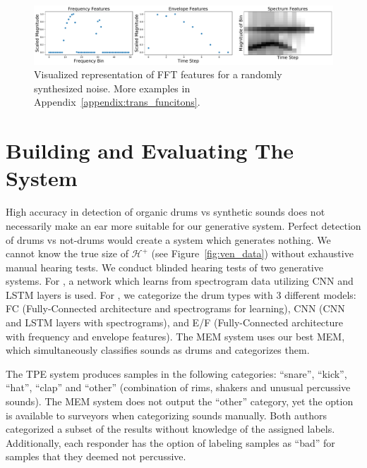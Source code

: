 \documentclass[runningheads,a4paper]{llncs}
\begin{document}
\begin{figure}[tbp]
\begin{center}
    \includegraphics[width=0.99\columnwidth]{templates_aimusic2020/images/ff3.pdf}
\caption{Visualized representation of FFT features for a randomly synthesized noise. More examples in Appendix~\ref{appendix:trans_funcitons}.}
\label{fig:stackspectrums}
    \end{center}
\end{figure}

\section{Building and Evaluating The System}

High accuracy in detection of organic drums vs synthetic sounds does not necessarily make an ear more suitable for our generative system. Perfect detection of drums vs not-drums would create a system which generates nothing.  We cannot know the true size of $\mathcal{H^{+}}$ (see Figure~\ref{fig:ven_data}) without exhaustive manual hearing tests. We conduct blinded hearing tests of two generative systems. For \decfirst, a network which learns from spectrogram data utilizing CNN and LSTM layers is used. For \decsecond, we categorize the drum types with 3 different models: FC (Fully-Connected architecture and spectrograms for learning), CNN (CNN and LSTM layers with spectrograms), and E/F (Fully-Connected architecture with frequency and envelope features). The MEM system uses our best MEM, which simultaneously classifies sounds as drums and categorizes them. 

The TPE system produces samples in the following categories: \enquote{snare}, \enquote{kick}, \enquote{hat}, \enquote{clap} and \enquote{other} (combination of rims, shakers and unusual percussive sounds). The MEM system does not output the \enquote{other} category, yet the option is available to surveyors when categorizing sounds manually.   
Both authors categorized a subset of the results without knowledge of the assigned labels. Additionally, each responder has the option of labeling samples as \enquote{bad} for samples that they deemed not percussive. 
\end{document}
